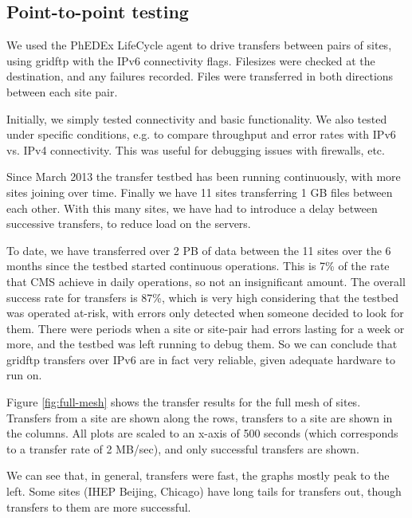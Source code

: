 \subsection{Point-to-point testing}

We used the PhEDEx LifeCycle agent \cite{LifeCycle} to drive transfers between pairs of sites, using gridftp with the IPv6 connectivity flags. Filesizes were checked at the destination, and any failures recorded. Files were transferred in both directions between each site pair.

Initially, we simply tested connectivity and basic functionality. We also tested under specific conditions, e.g. to compare throughput and error rates with IPv6 vs. IPv4 connectivity. This was useful for debugging issues with firewalls, etc.

Since March 2013 the transfer testbed has been running continuously, with more sites joining over time. Finally we have 11 sites transferring 1 GB files between each other. With this many sites, we have had to introduce a delay between successive transfers, to reduce load on the servers.

To date, we have transferred over 2 PB of data between the 11 sites over the 6 months since the testbed started continuous operations. This is 7\% of the rate that CMS achieve in daily operations, so not an insignificant amount. The overall success rate for transfers is 87\%, which is very high considering that the testbed was operated at-risk, with errors only detected when someone decided to look for them.
There were periods when a site or site-pair had errors lasting for a week or more, and the testbed was left running to debug them. So we can conclude that gridftp transfers over IPv6 are in fact very reliable, given adequate hardware to run on.

Figure \ref{fig:full-mesh} shows the transfer results for the full mesh of sites. Transfers from a site are shown along the rows, transfers to a site are shown in the columns. All plots are scaled to an x-axis of 500 seconds (which corresponds to a transfer rate of 2 MB/sec), and only successful transfers are shown.

We can see that, in general, transfers were fast, the graphs mostly peak to the left. Some sites (IHEP Beijing, Chicago) have long tails for transfers out, though transfers to them are more successful.

